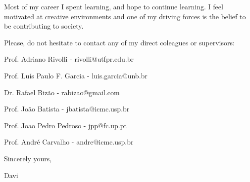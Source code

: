 \documentclass[letterpaper,11pt]{article}
\begin{document}
{\justifying
\Large
{}

Most of my career I spent learning, and hope to continue learning.
I feel motivated at creative environments and one of my driving forces is the belief to be contributing to society.

\vspace{20pt}

Please, do not hesitate to contact any of my direct coleagues or supervisors:

Prof. Adriano Rivolli - rivolli@utfpr.edu.br

Prof. Luís Paulo F. Garcia - luis.garcia@unb.br

Dr. Rafael Bizão - rabizao@gmail.com

Prof. João Batista - jbatista@icmc.usp.br

Prof. Joao Pedro Pedroso - jpp@fc.up.pt

Prof. André Carvalho - andre@icmc.usp.br

}

{\justifying
\Large
{}
\vspace{30pt}
\hspace{420pt} Sincerely yours,
\vspace{10pt}

\hspace{420pt} Davi
}

\newpage

\end{document}
